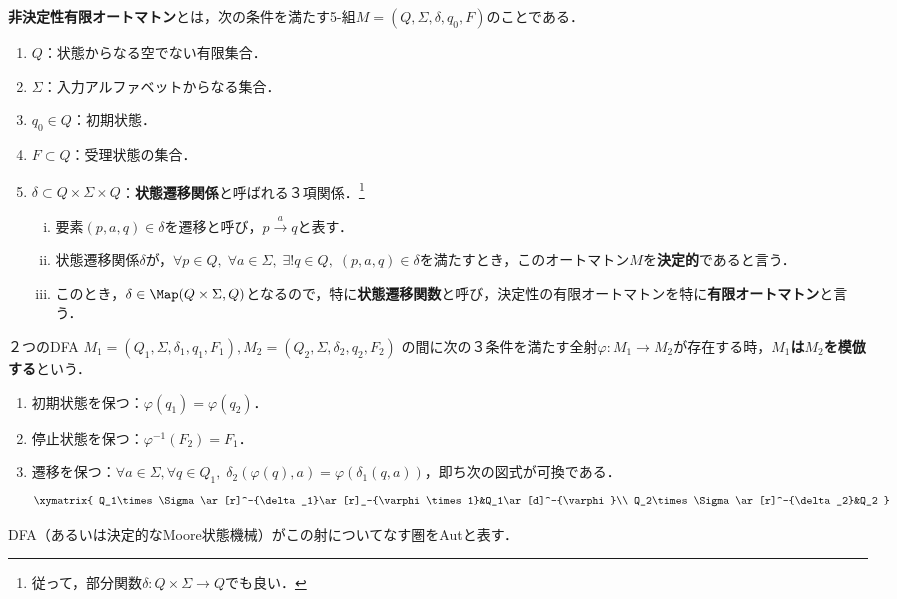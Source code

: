 \begin{definition}
    \textbf{非決定性有限オートマトン}とは，次の条件を満たす5-組$M=(Q,\Sigma,\delta,q_0,F)$のことである．
    \begin{enumerate}
        \item $Q$：状態からなる空でない有限集合．
        \item $\Sigma$：入力アルファベットからなる集合．
        \item $q_0\in Q$：初期状態．
        \item $F\subset Q$：受理状態の集合．
        \item $\delta\subset Q\times\Sigma\times Q$：\textbf{状態遷移関係}と呼ばれる３項関係．\footnote{従って，部分関数$\delta:Q\times\Sigma\to Q$でも良い．}
        \begin{enumerate}[(i)]
            \item 要素$(p,a,q)\in\delta$を遷移と呼び，$p\xrightarrow{a}q$と表す．
            \item 状態遷移関係$\delta$が，$\forall p\in Q,\;\forall a\in\Sigma,\;\exists!q\in Q,\;(p,a,q)\in\delta$を満たすとき，このオートマトン$M$を\textbf{決定的}であると言う．
            \item このとき，$\delta\in\Map(Q\times\Sigma,Q)$となるので，特に\textbf{状態遷移関数}と呼び，決定性の有限オートマトンを特に\textbf{有限オートマトン}と言う．
        \end{enumerate}
    \end{enumerate}
\end{definition}

\begin{definition}\label{def-category-of-DFA}
    ２つのDFA $M_1=(Q_1,\Sigma,\delta_1,q_1,F_1),M_2=(Q_2,\Sigma,\delta_2,q_2,F_2)$
    の間に次の３条件を満たす全射$\varphi:M_1\to M_2$が存在する時，\textbf{$M_1$は$M_2$を模倣する}という．
    \begin{enumerate}
        \item 初期状態を保つ：$\varphi(q_1)=\varphi(q_2)$．
        \item 停止状態を保つ：$\varphi^{-1}(F_2)=F_1$．
        \item 遷移を保つ：$\forall a\in\Sigma,\forall q\in Q_1,\;\delta_2(\varphi(q),a)=\varphi(\delta_1(q,a))$，即ち次の図式が可換である．
        \[\xymatrix{
            Q_1\times\Sigma\ar[r]^-{\delta_1}\ar[r]_-{\varphi\times 1}&Q_1\ar[d]^-{\varphi}\\
            Q_2\times\Sigma\ar[r]^-{\delta_2}&Q_2
        }\]
    \end{enumerate}
    DFA（あるいは決定的なMoore状態機械）がこの射についてなす圏をAutと表す．
\end{definition}

